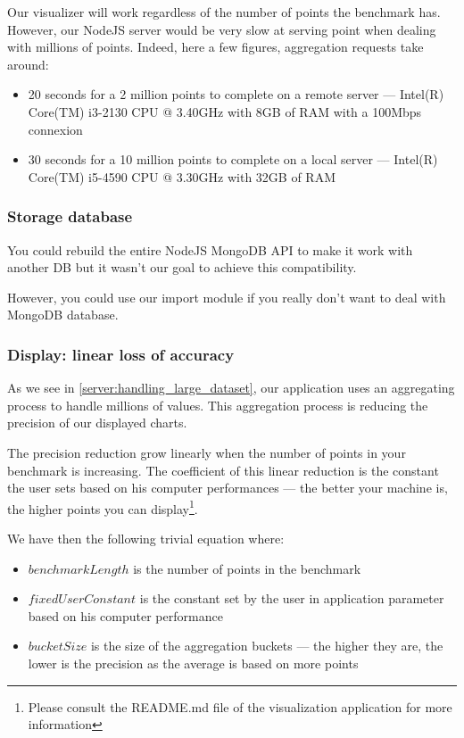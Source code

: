 \documentclass[a4paper,11pt]{report}
\begin{document}
Our visualizer will work regardless of the number of points the benchmark has. However, our NodeJS server would be very slow at serving point when dealing with millions of points. Indeed, here a few figures, aggregation requests take around:
\begin{itemize}
\item
20 seconds for a 2 million points to complete on a remote server --- Intel(R) Core(TM) i3-2130 CPU @ 3.40GHz with 8GB of RAM with a 100Mbps connexion
\item
30 seconds for a 10 million points to complete on a local server --- Intel(R) Core(TM) i5-4590 CPU @ 3.30GHz with 32GB of RAM
\end{itemize}

\subsubsection{Storage database}

You could rebuild the entire NodeJS MongoDB API to make it work with another DB but it wasn't our goal to achieve this compatibility.

However, you could use our import module if you really don't want to deal with MongoDB database.

\subsubsection{Display: linear loss of accuracy}

As we see in \ref{server:handling_large_dataset}, our application uses an aggregating process to handle millions of values. This aggregation process is reducing the precision of our displayed charts.

The precision reduction grow linearly when the number of points in your benchmark is increasing. The coefficient of this linear reduction is the constant the user sets based on his computer performances --- the better your machine is, the higher points you can display\footnote{Please consult the README.md file of the visualization application for more information}. 

We have then the following trivial equation where: 
\begin{itemize}
\item
$benchmarkLength$ is the number of points in the benchmark
\item
$fixedUserConstant$ is the constant set by the user in application parameter based on his computer performance
\item
$bucketSize$ is the size of the aggregation buckets --- the higher they are, the lower is the precision as the average is based on more points
\end{itemize}
\end{document}
